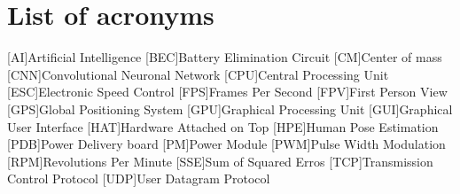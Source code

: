 \chapter*{List of acronyms}
\begin{acronym} 
    [AI]{Artificial Intelligence}
    [BEC]{Battery Elimination Circuit}
    [CM]{Center of mass}
    [CNN]{Convolutional Neuronal Network}
    [CPU]{Central Processing Unit}
    [ESC]{Electronic Speed Control}
    [FPS]{Frames Per Second}
    [FPV]{First Person View}
    [GPS]{Global Positioning System}
    [GPU]{Graphical Processing Unit}
    [GUI]{Graphical User Interface}
    [HAT]{Hardware Attached on Top}
    [HPE]{Human Pose Estimation}
    [PDB]{Power Delivery board}
    [PM]{Power Module}
    [PWM]{Pulse Width Modulation}
    [RPM]{Revolutions Per Minute}
    [SSE]{Sum of Squared Erros}
    [TCP]{Transmission Control Protocol}
    [UDP]{User Datagram Protocol}
\end{acronym}